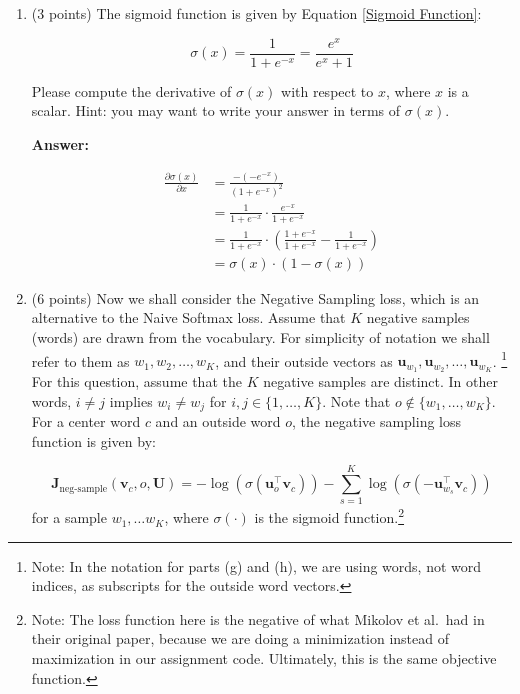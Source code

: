\documentclass{article}
\newenvironment{answer}{
    {\bf Answer:} \sf \begingroup\color{red}
}{\endgroup}%
\begin{document}
\begin{enumerate}[label=(\alph*)]
\item (3 points) The sigmoid function is given by Equation \ref{Sigmoid Function}:

\begin{equation}
    \label{Sigmoid Function}
    \sigma (x) = \frac{1}{1 + e^{-x}} = \frac{e^{x}}{e^{x} + 1}
\end{equation}

Please compute the derivative of $\sigma(x)$ with respect to $x$, where $x$ is a scalar. Hint: you may want to write your answer in terms of $\sigma(x)$.

\begin{shaded}
\begin{answer}
\begin{align*}
\frac{\partial \sigma(x)}{\partial x}
&= \frac{-(-e^{-x})}{(1+e^{-x})^2}\\
&= \frac{1}{1+e^{-x}} \cdot \frac{e^{-x}}{1 + e^{-x}}\\
&= \frac{1}{1+e^{-x}} \cdot \left( \frac{1 + e^{-x}}{1 + e^{-x}} - \frac{1}{1 + e^{-x}} \right)\\
&= \sigma(x) \cdot (1 - \sigma(x))
\end{align*}
\end{answer}
\end{shaded}

\item (6 points) Now we shall consider the Negative Sampling loss, which is an alternative to the Naive Softmax loss.  Assume that $K$ negative samples (words) are drawn from the vocabulary. For simplicity of notation we shall refer to them as $w_1, w_2, \dots, w_K$, and their outside vectors as $\bm u_{w_1}, \bm u_{w_2}, \dots, \bm u_{w_K}$. \footnote{Note: In the notation for parts (g) and (h), we are using words, not word indices, as subscripts for the outside word vectors.} For this question, assume that the $K$ negative samples are distinct. In other words, $i\neq j$ implies $w_i\neq w_j$ for $i,j\in\{1,\dots,K\}$.
Note that $o\notin\{w_1, \dots, w_K\}$. 
For a center word $c$ and an outside word $o$, the negative sampling loss function is given by:

\begin{equation}
\bm J_{\text{neg-sample}}(\bm v_c, o, \bm U) = -\log(\sigma(\bm u_o^\top \bm v_c)) - \sum_{s=1}^K \log(\sigma(-\bm u_{w_s}^\top \bm v_c))
\end{equation}
for a sample $w_1, \ldots w_K$, where $\sigma(\cdot)$ is the sigmoid function.\footnote{Note: The loss function here is the negative of what Mikolov et al.\ had in their original paper, because we are doing a minimization instead of maximization in our assignment code. Ultimately, this is the same objective function.}


\end{enumerate}
\end{document}
